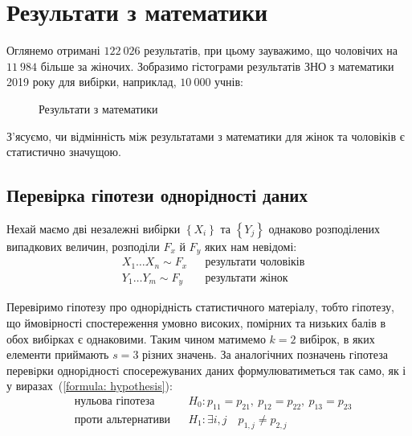 \section{Результати з математики}

Оглянемо отримані $122\ 026$ результатів, при цьому зауважимо, що чоловічих на $11\ 984$ більше за жіночих. 
Зобразимо гістограми результатів ЗНО з математики 2019 року для вибірки, наприклад, $10\ 000$ учнів:

\begin{figure}[H]
    \caption{Результати з математики}
    \label{figure: MATH initial data}
\end{figure}

З'ясуємо, чи відмінність між результатами з математики для жінок та чоловіків є статистично значущою.

\subsection{Перевірка гіпотези однорідності даних}

Нехай маємо дві незалежні вибірки $\left\{ X_i \right\}$ та $\left\{ Y_j \right\}$ однаково розподілених 
випадкових величин, розподіли $F_x$ й $F_y$ яких нам невідомі:
\begin{align*}
    &X_1 \ldots X_n\sim F_x && \text{результати чоловіків} \\
    &Y_1 \ldots Y_m\sim F_y && \text{результати жінок}
\end{align*}

Перевіримо гіпотезу про однорідність статистичного матеріалу, тобто гіпотезу, що ймовірності 
спостереження умовно високих, помірних та низьких балів в обох вибірках є однаковими. Таким чином 
матимемо $k=2$ вибірок, в яких елементи приймають $s=3$ різних значень. За аналогічних позначень 
гiпотеза перевiрки однорiдностi спосережуваних даних формулюватиметься так само, як і у 
виразах~(\ref{formula: hypothesis}):
\begin{align*}
    &\text{нульова гіпотеза} && H_0: p_{11}=p_{21},\ p_{12}=p_{22},\ p_{13}=p_{23} \\
    &\text{проти альтернативи} && H_1: \exists i,j\quad p_{1,j}\neq p_{2,j}
\end{align*}

